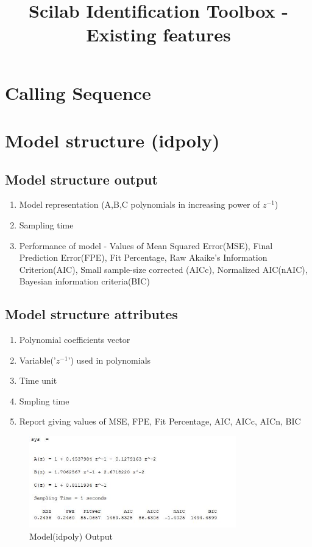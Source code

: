 \documentclass[a4paper,12pt]{report}
\title{Scilab Identification Toolbox - Existing features}
\begin{document}
	

	
\maketitle
	\tableofcontents		
	
	
\chapter{Calling Sequence}	
		
	
\chapter{Model structure (idpoly)}
	
	\section{Model structure output}
	\begin{enumerate}
		\item Model representation (A,B,C polynomials in increasing power of $z^{-1}$)
		
	\item  Sampling time 
	\item Performance of model - Values of Mean Squared Error(MSE), Final Prediction Error(FPE), Fit Percentage, Raw Akaike's Information Criterion(AIC), Small sample-size corrected (AICc), Normalized AIC(nAIC), Bayesian information criteria(BIC)
	\end{enumerate}
\section{Model structure attributes}
\begin{enumerate}
	\item Polynomial coefficients vector
	\item Variable('$z^{-1}$') used in polynomials
	\item Time unit
	\item Smpling time
	\item Report giving values of MSE, FPE, Fit Percentage, AIC, AICc, AICn, BIC
\end{enumerate}
	

	
	\begin{figure}[tbp]
		\centering
		\includegraphics[width=0.8\textwidth]{modSci1.JPG}
		\caption{Model(idpoly) Output}
		\label{}
	\end{figure}
	
\end{document}
